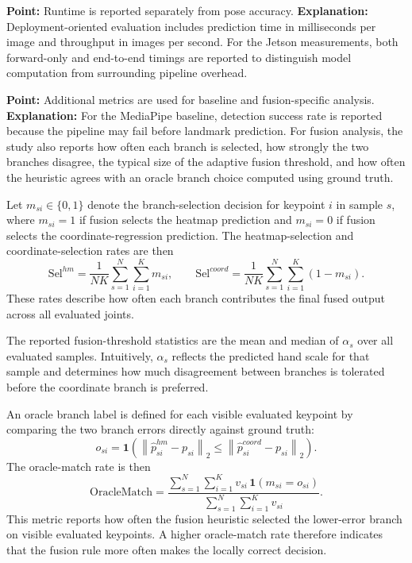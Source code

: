 \documentclass[10pt,letterpaper]{article}
\begin{document}
\medskip
\noindent\textbf{Point:} Runtime is reported separately from pose accuracy.  
\textbf{Explanation:} Deployment-oriented evaluation includes prediction time in milliseconds per image and throughput in images per second. For the Jetson measurements, both forward-only and end-to-end timings are reported to distinguish model computation from surrounding pipeline overhead.

\medskip
\noindent\textbf{Point:} Additional metrics are used for baseline and fusion-specific analysis.  
\textbf{Explanation:} For the MediaPipe baseline, detection success rate is reported because the pipeline may fail before landmark prediction. For fusion analysis, the study also reports how often each branch is selected, how strongly the two branches disagree, the typical size of the adaptive fusion threshold, and how often the heuristic agrees with an oracle branch choice computed using ground truth.

Let \(m_{si} \in \{0,1\}\) denote the branch-selection decision for keypoint \(i\) in sample \(s\), where \(m_{si}=1\) if fusion selects the heatmap prediction and \(m_{si}=0\) if fusion selects the coordinate-regression prediction. The heatmap-selection and coordinate-selection rates are then
\[
\mathrm{Sel}^{hm} =
\frac{1}{NK}
\sum_{s=1}^{N}\sum_{i=1}^{K} m_{si},
\qquad
\mathrm{Sel}^{coord} =
\frac{1}{NK}
\sum_{s=1}^{N}\sum_{i=1}^{K} (1-m_{si}).
\]
These rates describe how often each branch contributes the final fused output across all evaluated joints.

The reported fusion-threshold statistics are the mean and median of \(\alpha_s\) over all evaluated samples. Intuitively, \(\alpha_s\) reflects the predicted hand scale for that sample and determines how much disagreement between branches is tolerated before the coordinate branch is preferred.

An oracle branch label is defined for each visible evaluated keypoint by comparing the two branch errors directly against ground truth:
\[
o_{si} =
\mathbf{1}
\left(
\left\|
\hat{p}^{hm}_{si} - p_{si}
\right\|_2
\le
\left\|
\hat{p}^{coord}_{si} - p_{si}
\right\|_2
\right).
\]
The oracle-match rate is then
\[
\mathrm{OracleMatch} =
\frac{
\sum_{s=1}^{N}\sum_{i=1}^{K}
v_{si}\,\mathbf{1}(m_{si}=o_{si})
}{
\sum_{s=1}^{N}\sum_{i=1}^{K} v_{si}
}.
\]
This metric reports how often the fusion heuristic selected the lower-error branch on visible evaluated keypoints. A higher oracle-match rate therefore indicates that the fusion rule more often makes the locally correct decision.
\end{document}
